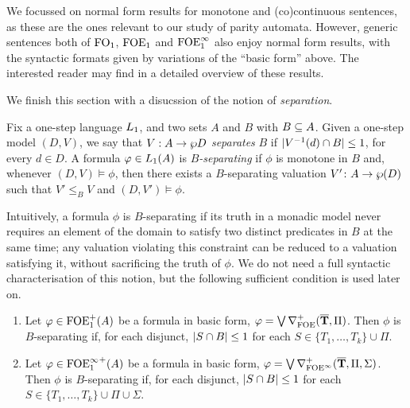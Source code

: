 \begin{remark} 
We focussed on normal form results for monotone and (co)continuous sentences, 
as these are the ones relevant to our study of parity automata.
However, generic sentences both of $\ofo$, $\ofoe$ and $\ofoei$ also enjoy 
normal form results, with the syntactic formats given by variations of the 
``basic form'' above. 
The interested reader may find in \cite{carr:mode18} a detailed 
overview of these results.
\end{remark}

We finish this section with a disucssion of the notion of \emph{separation}.

\begin{definition}
    \label{d:sep} 
Fix a one-step language $\oslang$, and two sets $A$ and $B$ with $B \sse A$.
Given a one-step model $(D,V)$, we say that $V: A \to \pow D$ \emph{separates}
$B$ if $\sz{V^{-1}(d) \cap B} \leq 1$, for every $d \in D$.
%
A formula $\phi \in \oslang(A)$ is \emph{$B$-separating} if $\phi$ is monotone
in $B$ and, whenever $(D,V) \models \phi$, then there exists a $B$-separating 
valuation $V' \: A \to \pow(D)$ such that $V' \leq_{B} V$ and $(D,V') \models
\phi$. 
\end{definition}

Intuitively, a formula $\phi$ is $B$-separating if its truth in a monadic model
never requires an element of the domain to satisfy two distinct predicates in 
$B$ at the same time; any valuation violating this constraint can be reduced to
a valuation satisfying it, without sacrificing the truth of $\phi$.
We do not need a full syntactic characterisation of this notion, but the 
following sufficient condition is used later on.

\begin{proposition}  
\label{p:sep}
\begin{enumerate}[(1)]
\item 
Let $\phi \in \ofoe^{+}(A)$ be a formula in basic form, $\phi = 
\bigvee \posdbnfofoe{\vlist{T}}{\Pi}$. 
Then $\phi$ is $B$-separating if, for each disjunct,  $\sz{S \cap B} \leq 1$ for 
each $S \in \{T_1, \dots, T_k\} \cup \Pi$.
\item
Let $\phi \in {\ofoei}^{+}(A)$ be a formula in basic form, $\phi = 
\bigvee \mondbnfofoei{\vlist{T}}{\Pi}{\Sigma}{+}$. 
Then $\phi$ is $B$-separating if, for each disjunct,  $\sz{S \cap B} \leq 1$ for 
each $S \in \{T_1, \dots, T_k\} \cup \Pi \cup \Sigma$.
\end{enumerate}
\end{proposition}

